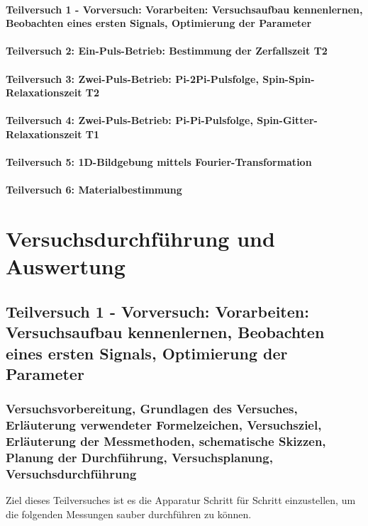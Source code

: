 \documentclass[12pt,oneside,oldfontcommands]{memoir}
\begin{document}
\paragraph{Teilversuch 1 - Vorversuch: Vorarbeiten: Versuchsaufbau kennenlernen, Beobachten eines ersten Signals, Optimierung der Parameter}
\paragraph{Teilversuch 2: Ein-Puls-Betrieb: Bestimmung der Zerfallszeit T2}
\paragraph{Teilversuch 3: Zwei-Puls-Betrieb: Pi-2Pi-Pulsfolge, Spin-Spin-Relaxationszeit T2}
\paragraph{Teilversuch 4: Zwei-Puls-Betrieb: Pi-Pi-Pulsfolge, Spin-Gitter-Relaxationszeit T1}
\paragraph{Teilversuch 5: 1D-Bildgebung mittels Fourier-Transformation}
\paragraph{Teilversuch 6: Materialbestimmung}

\section{Versuchsdurchführung und Auswertung}
\subsection{Teilversuch 1 - Vorversuch: Vorarbeiten: Versuchsaufbau kennenlernen, Beobachten eines ersten Signals, Optimierung der Parameter}
\subsubsection{Versuchsvorbereitung, Grundlagen des Versuches, Erläuterung verwendeter Formelzeichen, Versuchsziel, Erläuterung der Messmethoden, schematische Skizzen, Planung der Durchführung, Versuchsplanung, Versuchsdurchführung}
Ziel dieses Teilversuches ist es die Apparatur Schritt für Schritt einzustellen, um die folgenden Messungen sauber durchführen zu können.
\end{document}
